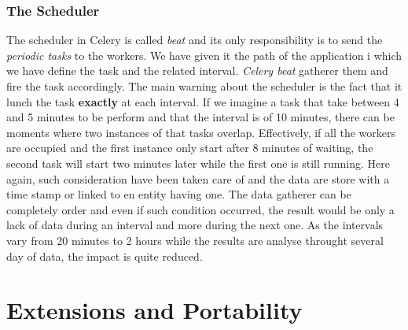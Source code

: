 \subsubsection*{The Scheduler}
The scheduler in Celery is called \emph{beat} and its only responsibility is to send the \emph{periodic tasks} to the workers. We have given it the path of the application i which we have define the task and the related interval. \emph{Celery beat} gatherer them and fire the task accordingly. The main warning about the scheduler is the fact that it lunch the task \textbf{exactly} at each interval. If we imagine a task that take between 4 and 5 minutes to be perform and that the interval is of 10 minutes, there can be moments where two instances of that tasks overlap. Effectively, if all the workers are occupied and the first instance only start after 8 minutes of waiting, the second task will start two minutes later while the first one is still running. Here again, such consideration have been taken care of and the data are store with a time stamp or linked to en entity having one. The data gatherer can be completely order and even if such condition occurred, the result would be only a lack of data during an interval and more during the next one. As the intervals vary from 20 minutes to 2 hours while the results are analyse throught several day of data, the impact is quite reduced. 

\section{Extensions and Portability}

